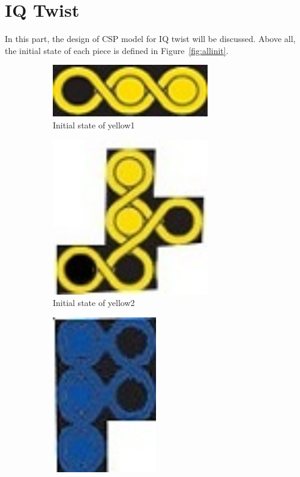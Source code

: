 \section{IQ Twist}
In this part, the design of CSP model for IQ twist will be discussed. Above all, the initial state of each piece is defined in Figure~\ref{fig:allinit}.
\begin{figure}[htbp]
\begin{subfigure}[b]{.24\textwidth}
\centering
\includegraphics[width=0.75\textwidth]{figs/yellow1.jpg}
\caption{Initial state of yellow1}
  \label{fig:2Dyellow1}
\end{subfigure}
\begin{subfigure}[b]{.24\textwidth}
\centering
\includegraphics[width=0.75\textwidth]{figs/yellow2.jpg}
\caption{Initial state of yellow2}
  \label{fig:2Dyellow2}
\end{subfigure}
\begin{subfigure}[b]{.24\textwidth}
\centering
\includegraphics[width =0.5\textwidth]{figs/blue1.jpg}

\end{subfigure}
\end{figure}
